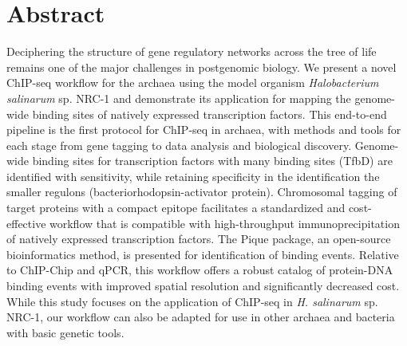 \section{Abstract}

Deciphering the structure of gene regulatory networks across the tree of life remains one of the major challenges in postgenomic biology. We present a novel ChIP-seq workflow for the archaea using the model organism {\em Halobacterium salinarum} sp. NRC-1 and demonstrate its application for mapping the genome-wide binding sites of natively expressed transcription factors. This end-to-end pipeline is the first protocol for ChIP-seq in archaea, with methods and tools for each stage from gene tagging to data analysis and biological discovery. Genome-wide binding sites for transcription factors with many binding sites (TfbD) are identified with sensitivity, while retaining specificity in the identification the smaller regulons (bacteriorhodopsin-activator protein). Chromosomal tagging of target proteins with a compact epitope facilitates a standardized and cost-effective workflow that is compatible with high-throughput immunoprecipitation of natively expressed transcription factors. The Pique package, an open-source bioinformatics method, is presented for identification of binding events. Relative to ChIP-Chip and qPCR, this workflow offers a robust catalog of protein-DNA binding events with improved spatial resolution and significantly decreased cost. While this study focuses on the application of ChIP-seq in {\em H. salinarum} sp. NRC-1, our workflow can also be adapted for use in other archaea and bacteria with basic genetic tools.
